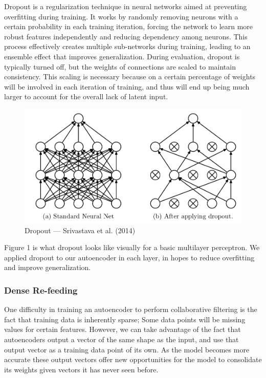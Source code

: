 \documentclass{article}
\begin{document}
Dropout is a regularization technique in neural networks aimed at preventing overfitting during training. It works by randomly removing neurons with a certain probability in each training iteration, forcing the network to learn more robust features independently and reducing dependency among neurons. This process effectively creates multiple sub-networks during training, leading to an ensemble effect that improves generalization. During evaluation, dropout is typically turned off, but the weights of connections are scaled to maintain consistency. This scaling is necessary because on a certain percentage of weights will be involved in each iteration of training, and thus will end up being much larger to account for the overall lack of latent input.
\begin{figure}[H]
    \centering
    \includegraphics[width=0.5\linewidth]{figures/dropout.png}
    \caption{Dropout — Srivastava et al. (2014)}
    \label{fig:enter-label}
\end{figure}

\noindent Figure 1 is what dropout looks like visually for a basic multilayer perceptron. We applied dropout to our autoencoder in each layer, in hopes to reduce overfitting and improve generalization.
\subsubsection{Dense Re-feeding}
One difficulty in training an autoencoder to perform collaborative filtering is the fact that training data is inherently sparse; Some data points will be missing values for certain features. However, we can take advantage of the fact that autoencoders output a vector of the same shape as the input, and use that output vector as a training data point of its own. As the model becomes more accurate these output vectors offer new opportunities for the model to consolidate its weights given vectors it has never seen before. 
\end{document}
